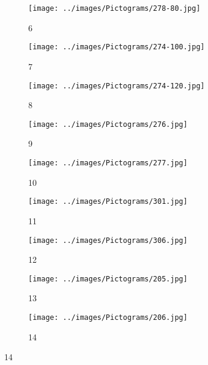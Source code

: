 \begin{figure}[H]
	\hspace{3em}%
	\begin{subfigure}[b]{0.1\textwidth}
		\centering
		\texttt{[image: ../images/Pictograms/278-80.jpg]}
		\caption{6}
	\end{subfigure}
	\hspace{3em}%
	\begin{subfigure}[b]{0.1\textwidth}
	\centering
	\texttt{[image: ../images/Pictograms/274-100.jpg]}
	\caption{7}
	\end{subfigure}
	\hspace{3em}%
	\begin{subfigure}[b]{0.1\textwidth}
		\centering
		\texttt{[image: ../images/Pictograms/274-120.jpg]}
		\caption{8}
  \end{subfigure}
  \hspace{3em}%
  \begin{subfigure}[b]{0.1\textwidth}
		\centering
		\texttt{[image: ../images/Pictograms/276.jpg]}
		\caption{9}
  \end{subfigure}
  \hspace{3em}%
  \begin{subfigure}[b]{0.1\textwidth}
		\centering
		\texttt{[image: ../images/Pictograms/277.jpg]}
		\caption{10}
  \end{subfigure}
  \hspace{3em}%
  \begin{subfigure}[b]{0.1\textwidth}
	\centering
	\texttt{[image: ../images/Pictograms/301.jpg]}
	\caption{11}
  \end{subfigure}
  \hspace{3em}%
  \begin{subfigure}[b]{0.1\textwidth}
	  \centering
	  \texttt{[image: ../images/Pictograms/306.jpg]}
	  \caption{12}
  \end{subfigure}
  \hspace{3em}%
  \begin{subfigure}[b]{0.1\textwidth}
	  \centering
	  \texttt{[image: ../images/Pictograms/205.jpg]}
	  \caption{13}
  \end{subfigure}
  \hspace{3em}%
  \begin{subfigure}[b]{0.1\textwidth}
	  \centering
	  \texttt{[image: ../images/Pictograms/206.jpg]}
	  \caption{14}
  \end{subfigure}
  \hspace{3em}%

\end{figure}
